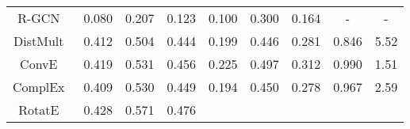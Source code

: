 \documentclass[sigconf]{acmart}
\begin{document}
\begin{table*}[htbp!]
{\begin{tabular}{c|rrr|rrr|rr}
           \multicolumn{1}{c|}{R-GCN~\cite{RGCN}} 
            & \multicolumn{1}{c}{0.080} 
            & \multicolumn{1}{c}{0.207} 
            & \multicolumn{1}{c|}{0.123}
            
           &\multicolumn{1}{c}{0.100} 
           &\multicolumn{1}{c}{0.300}
           & \multicolumn{1}{c|}{0.164}
           


           
           &\multicolumn{1}{c}{-} 
           & \multicolumn{1}{c}{-} \\
            
            \multicolumn{1}{c|}{DistMult~\cite{DistMult}}
            & \multicolumn{1}{c}{0.412} 
            & \multicolumn{1}{c}{0.504}
            & \multicolumn{1}{c|}{0.444}
              
            &\multicolumn{1}{c}{0.199} 
            &\multicolumn{1}{c}{0.446}
            & \multicolumn{1}{c|}{0.281} 
            


           &\multicolumn{1}{c}{0.846} 
           & \multicolumn{1}{c}{5.52} \\
            
            \multicolumn{1}{c|}{ConvE~\cite{ConvE}}
            & \multicolumn{1}{c}{0.419} 
            & \multicolumn{1}{c}{0.531}
            & \multicolumn{1}{c|}{0.456}
              
            &\multicolumn{1}{c}{0.225} 
            &\multicolumn{1}{c}{0.497}
            & \multicolumn{1}{c|}{0.312} 
            


           &\multicolumn{1}{c}{0.990} 
           & \multicolumn{1}{c}{1.51} \\
           
            \multicolumn{1}{c|}{ComplEx~\cite{ComplEx}}
            &\multicolumn{1}{c}{0.409}
            & \multicolumn{1}{c}{0.530}
            & \multicolumn{1}{c|}{0.449}
         
            & \multicolumn{1}{c}{0.194}
            & \multicolumn{1}{c}{0.450}
            & \multicolumn{1}{c|}{0.278}
            


            
           &\multicolumn{1}{c}{0.967} 
           & \multicolumn{1}{c}{2.59} \\
           
            \multicolumn{1}{c|}{RotatE~\cite{RotatE}}
            & \multicolumn{1}{c}{0.428} 
            & \multicolumn{1}{c}{0.571}
            & \multicolumn{1}{c|}{{0.476}}
              

\end{tabular}}
\end{table*}
\end{document}
